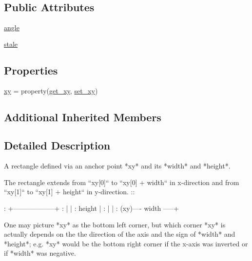 \subsection*{Public Attributes}
\begin{DoxyCompactItemize}
\item 
\hyperlink{classmatplotlib_1_1patches_1_1Rectangle_afcd2b4e52594d4950ba836cbbffc90de}{angle}
\item 
\hyperlink{classmatplotlib_1_1patches_1_1Rectangle_a96ab0b5fed1ee33aff151d16ab9078e7}{stale}
\end{DoxyCompactItemize}
\subsection*{Properties}
\begin{DoxyCompactItemize}
\item 
\hyperlink{classmatplotlib_1_1patches_1_1Rectangle_a7febcd40cac82459d66c33ddfc6ba09f}{xy} = property(\hyperlink{classmatplotlib_1_1patches_1_1Rectangle_a4b017693949cd5ea9f162f168f8e0855}{get\+\_\+xy}, \hyperlink{classmatplotlib_1_1patches_1_1Rectangle_aba57bf8a9cd2c16f5b53412b4228e5c7}{set\+\_\+xy})
\end{DoxyCompactItemize}
\subsection*{Additional Inherited Members}


\subsection{Detailed Description}
\begin{DoxyVerb}A rectangle defined via an anchor point *xy* and its *width* and *height*.

The rectangle extends from ``xy[0]`` to ``xy[0] + width`` in x-direction
and from ``xy[1]`` to ``xy[1] + height`` in y-direction. ::

  :                +------------------+
  :                |                  |
  :              height               |
  :                |                  |
  :               (xy)---- width -----+

One may picture *xy* as the bottom left corner, but which corner *xy* is
actually depends on the the direction of the axis and the sign of *width*
and *height*; e.g. *xy* would be the bottom right corner if the x-axis
was inverted or if *width* was negative.
\end{DoxyVerb}
 

